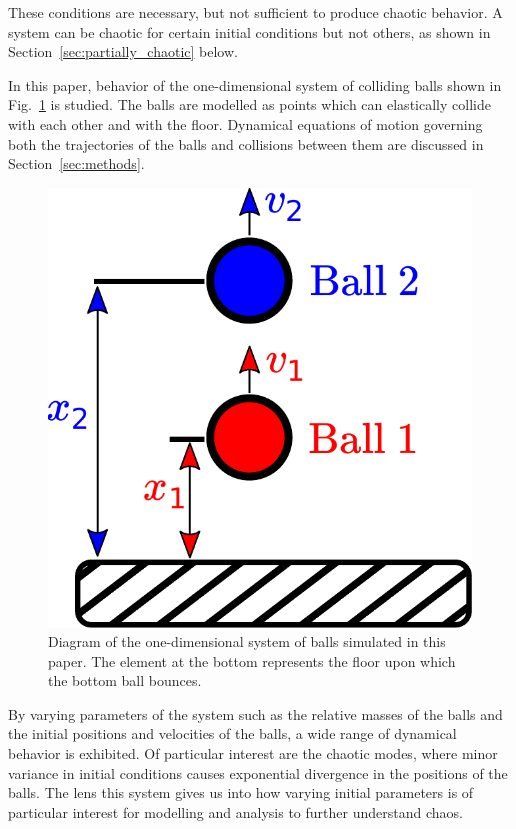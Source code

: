 \documentclass[pra,twocolumn,showpacs,amsmath,amssymb, aps, 10pt]{revtex4-1}
\begin{document}
These conditions are necessary, but not sufficient to produce chaotic behavior.
A system can be chaotic for certain initial conditions but not others, as shown
in Section~\ref{sec:partially_chaotic} below.

In this paper, behavior of the one-dimensional system of colliding balls shown
in Fig.~\ref{fig:balls} is studied.
The balls are modelled as points which can elastically collide with each other
and with the floor. Dynamical equations of motion governing both the trajectories
of the balls and collisions between them are discussed
in Section~\ref{sec:methods}.

\begin{figure}[h]
  \includegraphics[width=.8\linewidth]{balls}
  \caption{Diagram of the one-dimensional system of balls simulated in this
  paper. The element at the bottom represents the floor upon which the bottom
  ball bounces.}
  \label{fig:balls}
\end{figure}

By varying parameters of the system such as the relative masses of the balls and
the initial positions and velocities of the balls, a wide range of dynamical
behavior is exhibited. Of particular interest are the chaotic modes, where
minor variance in initial conditions causes exponential divergence in the positions
of the balls. The lens this system gives us into how varying initial
parameters is of particular interest for modelling and analysis to further
understand chaos.
\end{document}
